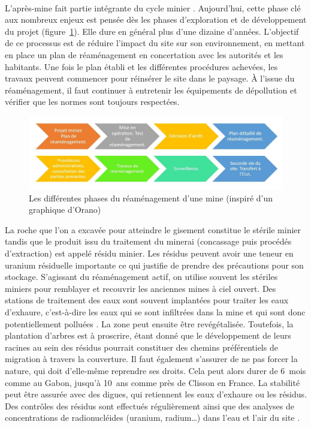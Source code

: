 \documentclass{article}
\begin{document}
\paragraph{} L’après-mine fait partie intégrante du cycle minier \cite{himeur_apres-mine_2020}. Aujourd’hui, cette phase clé aux nombreux enjeux est pensée dès les phases d’exploration et de développement du projet (figure~\ref{fig:phases_reamenagement}). Elle dure en général plus d'une dizaine d’années. L’objectif de ce processus est de réduire l’impact du site sur son environnement, en mettant en place un plan de réaménagement en concertation avec les autorités et les habitants. Une fois le plan établi et les différentes procédures achevées, les travaux peuvent commencer pour réinsérer le site dans le paysage. À l’issue du réaménagement, il faut continuer à entretenir les équipements de dépollution et vérifier que les normes sont toujours respectées.


\begin{figure}[H]
    \centering
    \includegraphics[width= \textwidth]{I_B_3.jpg}
    \caption{Les différentes phases du réaménagement d'une mine (inspiré d'un graphique d'Orano)}
    \label{fig:phases_reamenagement}
\end{figure}

La roche que l’on a excavée pour atteindre le gisement constitue le stérile minier tandis que le produit issu du traitement du minerai (concassage puis procédés d'extraction) est appelé résidu minier. Les résidus peuvent avoir une teneur en uranium résiduelle importante ce qui justifie de prendre des précautions pour son stockage.
S'agissant du réaménagement actif, on utilise souvent les stériles miniers pour remblayer et recouvrir les anciennes mines à ciel ouvert.
Des stations de traitement des eaux sont souvent implantées pour traiter les eaux d’exhaure, c'est-à-dire les eaux qui se sont infiltrées dans la mine et qui sont donc potentiellement polluées \cite{schick_les_2020}.
La zone peut ensuite être revégétalisée. Toutefois, la plantation d'arbres est à proscrire, étant donné que le développement de leurs racines au sein des résidus pourrait constituer des chemins préférentiels de migration à travers la couverture. Il faut également s’assurer de ne pas forcer la nature, qui doit d’elle-même reprendre ses droits. Cela peut alors durer de 6~mois comme au Gabon, jusqu'à 10~ans comme près de Clisson en France. La stabilité peut être assurée avec des digues, qui retiennent les eaux d’exhaure ou les résidus. Des contrôles des résidus sont effectués régulièrement ainsi que des analyses de concentrations de radionucléides (uranium, radium…) dans l’eau et l’air du site \cite{himeur_apres-mine_2020}.
\end{document}
